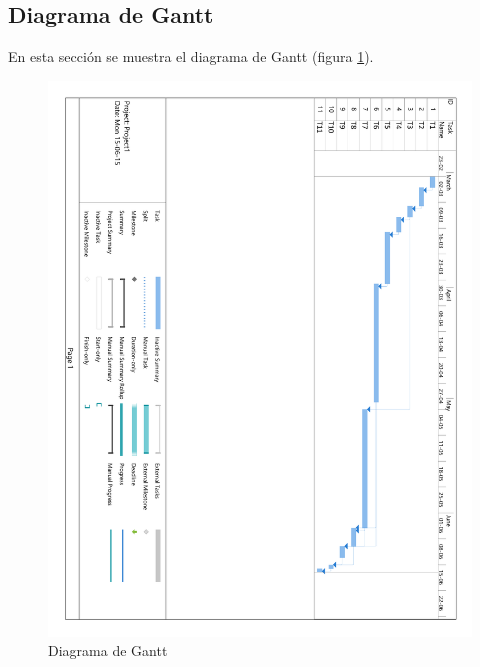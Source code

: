 \subsection{Diagrama de Gantt}

En esta sección se muestra el diagrama de Gantt (figura \ref{fig:gantt_diagram}).

\begin{figure}[!htp]
	\centering
	\includegraphics[page=1, scale=.6]{fig/gantt_diagram_simplified}
	\caption{Diagrama de Gantt}\label{fig:gantt_diagram}
\end{figure}

